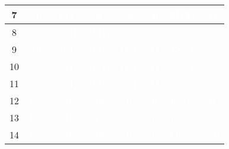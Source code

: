 \documentclass{article}
\begin{document}
\begin{center}
\begin{tabular}{|c|c|c|c|c|c|c|c|}
7 & \cellcolor{rojo}\textcolor{white}{0} & \cellcolor{verde}\textcolor{white}{6(1)} & \cellcolor{rojo}\textcolor{white}{6} & \cellcolor{rojo}\textcolor{white}{6} & \cellcolor{rojo}\textcolor{white}{6} & \cellcolor{verde}\textcolor{white}{51(3)} & \cellcolor{rojo}\textcolor{white}{51} \\ \hline
8 & \cellcolor{rojo}\textcolor{white}{0} & \cellcolor{verde}\textcolor{white}{6(1)} & \cellcolor{verde}\textcolor{white}{10(1)} & \cellcolor{rojo}\textcolor{white}{10} & \cellcolor{rojo}\textcolor{white}{10} & \cellcolor{verde}\textcolor{white}{68(4)} & \cellcolor{rojo}\textcolor{white}{68} \\ \hline
9 & \cellcolor{rojo}\textcolor{white}{0} & \cellcolor{verde}\textcolor{white}{6(1)} & \cellcolor{verde}\textcolor{white}{10(1)} & \cellcolor{verde}\textcolor{white}{11(1)} & \cellcolor{rojo}\textcolor{white}{11} & \cellcolor{verde}\textcolor{white}{68(4)} & \cellcolor{rojo}\textcolor{white}{68} \\ \hline
10 & \cellcolor{rojo}\textcolor{white}{0} & \cellcolor{verde}\textcolor{white}{6(1)} & \cellcolor{verde}\textcolor{white}{10(1)} & \cellcolor{verde}\textcolor{white}{11(1)} & \cellcolor{rojo}\textcolor{white}{11} & \cellcolor{verde}\textcolor{white}{85(5)} & \cellcolor{rojo}\textcolor{white}{85} \\ \hline
11 & \cellcolor{rojo}\textcolor{white}{0} & \cellcolor{verde}\textcolor{white}{6(1)} & \cellcolor{verde}\textcolor{white}{10(1)} & \cellcolor{verde}\textcolor{white}{11(1)} & \cellcolor{rojo}\textcolor{white}{11} & \cellcolor{verde}\textcolor{white}{85(5)} & \cellcolor{rojo}\textcolor{white}{85} \\ \hline
12 & \cellcolor{verde}\textcolor{white}{16(1)} & \cellcolor{rojo}\textcolor{white}{16} & \cellcolor{rojo}\textcolor{white}{16} & \cellcolor{rojo}\textcolor{white}{16} & \cellcolor{rojo}\textcolor{white}{16} & \cellcolor{verde}\textcolor{white}{102(6)} & \cellcolor{rojo}\textcolor{white}{102} \\ \hline
13 & \cellcolor{verde}\textcolor{white}{16(1)} & \cellcolor{rojo}\textcolor{white}{16} & \cellcolor{rojo}\textcolor{white}{16} & \cellcolor{rojo}\textcolor{white}{16} & \cellcolor{rojo}\textcolor{white}{16} & \cellcolor{verde}\textcolor{white}{102(6)} & \cellcolor{rojo}\textcolor{white}{102} \\ \hline
14 & \cellcolor{verde}\textcolor{white}{16(1)} & \cellcolor{rojo}\textcolor{white}{16} & \cellcolor{rojo}\textcolor{white}{16} & \cellcolor{rojo}\textcolor{white}{16} & \cellcolor{rojo}\textcolor{white}{16} & \cellcolor{verde}\textcolor{white}{119(7)} & \cellcolor{rojo}\textcolor{white}{119} \\ \hline

\end{tabular}
\end{center}
\end{document}
